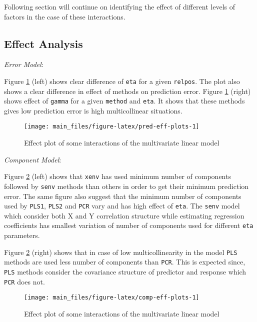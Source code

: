 \documentclass[12pt,3p,authoryear]{elsarticle}
\begin{document}
Following section will continue on identifying the effect of different
levels of factors in the case of these interactions.

\subsection{Effect Analysis}\label{effect-analysis}

\emph{Error Model}:

Figure \ref{fig:pred-eff-plots} (left) shows clear difference of
\texttt{eta} for a given \texttt{relpos}. The plot also shows a clear
difference in effect of methods on prediction error. Figure
\ref{fig:pred-eff-plots} (right) shows effect of \texttt{gamma} for a
given \texttt{method} and \texttt{eta}. It shows that these methods
gives low prediction error is high multicollinear situations.

\begin{figure}
\texttt{[image: main\_files/figure-latex/pred-eff-plots-1]} \caption{Effect plot of some interactions of the multivariate linear model}\label{fig:pred-eff-plots}
\end{figure}

\emph{Component Model}:

Figure \ref{fig:comp-eff-plots} (left) shows that \texttt{xenv} has used
minimum number of components followed by \texttt{senv} methods than
others in order to get their minimum prediction error. The same figure
also suggest that the minimum number of components used by
\texttt{PLS1}, \texttt{PLS2} and \texttt{PCR} vary and has high effect
of \texttt{eta}. The \texttt{senv} model which consider both X and Y
correlation structure while estimating regression coefficients has
smallest variation of number of components used for different
\texttt{eta} parameters.

Figure \ref{fig:comp-eff-plots} (right) shows that in case of low
multicollinearity in the model \texttt{PLS} methods are used less number
of components than \texttt{PCR}. This is expected since, \texttt{PLS}
methods consider the covariance structure of predictor and response
which \texttt{PCR} does not.

\begin{figure}
\texttt{[image: main\_files/figure-latex/comp-eff-plots-1]} \caption{Effect plot of some interactions of the multivariate linear model}\label{fig:comp-eff-plots}
\end{figure}

\hypertarget{refs}{}

\appendix



\renewcommand\refname{References}

\end{document}
